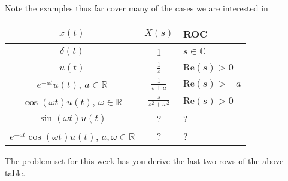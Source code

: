 \documentclass{article}
\begin{document}
Note the examples thus far cover many of the cases we are interested in

\begin{tabular}{ccl}
  $x(t)$ & $X(s)$ & ROC \\
  \hline
  $\delta(t)$ & 1 & $s\in\mathbb{C}$\\
  $u(t)$ & $\frac{1}{s}$ & $\text{Re}(s) > 0$\\
  $e^{-at}u(t)$, $a\in\mathbb{R}$ & $\frac{1}{s+a}$ & $\text{Re}(s) > -a$\\
  $\cos(\omega t)u(t)$, $\omega\in\mathbb{R}$ & $\frac{s}{s^2 + \omega^2}$ & $\text{Re}(s) > 0$\\
  $\sin(\omega t)u(t)$ & ? & ?\\
  $e^{-at}\cos(\omega t)u(t)$, $a,\omega\in\mathbb{R}$ & ? & ?
\end{tabular}

The problem set for this week has you derive the last two rows of the above table.
\end{document}
